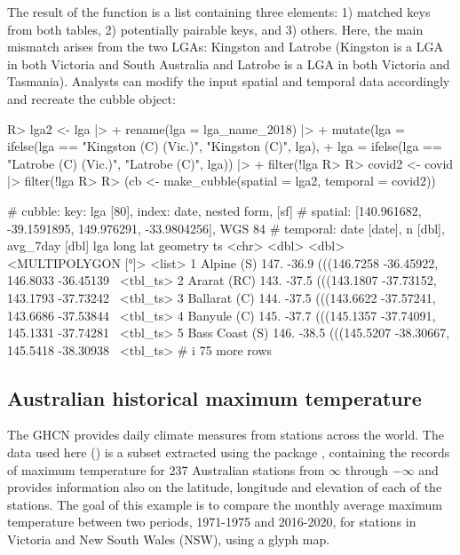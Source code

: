 \documentclass[
  shortnames]{jss}
\begin{document}
The result of the  function is a list containing three elements: 1) matched keys from both tables, 2) potentially pairable keys, and 3) others. Here, the main mismatch arises from the two LGAs: Kingston and Latrobe (Kingston is a LGA in both Victoria and South Australia and Latrobe is a LGA in both Victoria and Tasmania). Analysts can modify the input spatial and temporal data accordingly and recreate the cubble object:

\begin{CodeChunk}
\begin{CodeInput}
R> lga2 <- lga |>
+   rename(lga = lga_name_2018) |> 
+   mutate(lga = ifelse(lga == "Kingston (C) (Vic.)", "Kingston (C)", lga),
+          lga = ifelse(lga == "Latrobe (C) (Vic.)", "Latrobe (C)", lga)) |>
+   filter(!lga %
R>   
R> covid2 <- covid |> filter(!lga %
R> 
R> (cb <- make_cubble(spatial = lga2, temporal = covid2))
\end{CodeInput}
\begin{CodeOutput}
# cubble:   key: lga [80], index: date, nested form, [sf]
# spatial:  [140.961682, -39.1591895, 149.976291, -33.9804256], WGS 84
# temporal: date [date], n [dbl], avg_7day [dbl]
  lga             long   lat                                   geometry ts      
  <chr>          <dbl> <dbl>                         <MULTIPOLYGON [°]> <list>  
1 Alpine (S)      147. -36.9 (((146.7258 -36.45922, 146.8033 -36.45139~ <tbl_ts>
2 Ararat (RC)     143. -37.5 (((143.1807 -37.73152, 143.1793 -37.73242~ <tbl_ts>
3 Ballarat (C)    144. -37.5 (((143.6622 -37.57241, 143.6686 -37.53844~ <tbl_ts>
4 Banyule (C)     145. -37.7 (((145.1357 -37.74091, 145.1331 -37.74281~ <tbl_ts>
5 Bass Coast (S)  146. -38.5 (((145.5207 -38.30667, 145.5418 -38.30938~ <tbl_ts>
# i 75 more rows
\end{CodeOutput}
\end{CodeChunk}

\hypertarget{historicaltmax}{%
\subsection{Australian historical maximum temperature}\label{historicaltmax}}

The GHCN provides daily climate measures from stations across the world. The data used here () is a subset extracted using the package  \citep{rnoaa}, containing the records of maximum temperature for 237 Australian stations from \ensuremath{\infty{}} through \ensuremath{-\infty{}} and provides information also on the latitude, longitude and elevation of each of the stations. The goal of this example is to compare the monthly average maximum temperature between two periods, 1971-1975 and 2016-2020, for stations in Victoria and New South Wales (NSW), using a glyph map.
\end{document}
